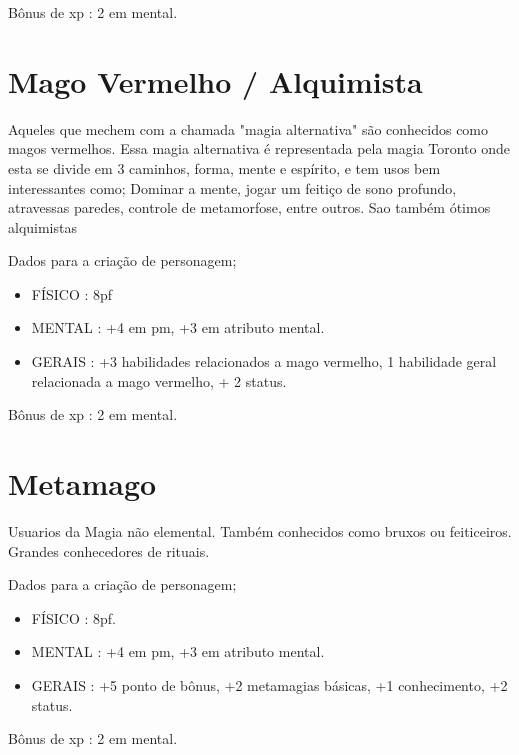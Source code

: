 Bônus de xp : 2 em mental.

\section{Mago Vermelho / Alquimista }

 Aqueles que mechem com a chamada "magia alternativa" são conhecidos como magos vermelhos. Essa magia alternativa é representada pela magia Toronto onde esta se divide em 3 caminhos, forma, mente e espírito, e tem usos bem interessantes como; Dominar a mente, jogar um feitiço de sono profundo, atravessas paredes, controle de metamorfose, entre outros. Sao também ótimos alquimistas

Dados para a criação de personagem;

\begin{itemize}


	\item FÍSICO : 8pf  

	\item MENTAL : +4 em pm, +3 em atributo mental.

	\item GERAIS : +3 habilidades relacionados a mago vermelho, 1 habilidade geral relacionada a mago vermelho, + 2 status.

\end{itemize}

Bônus de xp : 2 em mental.

\section{Metamago}

Usuarios da Magia não elemental. Também conhecidos como bruxos ou feiticeiros. Grandes conhecedores de rituais.

Dados para a criação de personagem;

\begin{itemize}


	\item FÍSICO : 8pf.  

	\item MENTAL : +4 em pm, +3 em atributo mental. 

	\item GERAIS : +5 ponto de bônus, +2 metamagias básicas, +1 conhecimento, +2 status.

\end{itemize}

Bônus de xp : 2 em mental.

